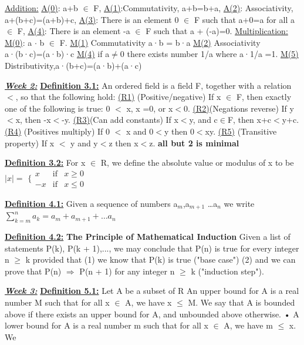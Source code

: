 \documentclass[10pt]{article}
\begin{document}
\underline{Addition:} \underline{A(0)}: a+b $\in$ F, \underline{A(1)}:Commutativity, a+b=b+a, \underline{A(2)}: Associativity, a+(b+c)=(a+b)+c, \underline{A(3)}: There is an element 0 $\in$ F such that a+0=a
for all a $\in$ F, \underline{A(4)}: There is an element -a $\in$ F such that a + (-a)=0.
\underline{Multiplication:} \underline{M(0)}: a $\cdot$ b $\in$ F. \underline{M(1)} Commutativity a·b = b·a \underline{M(2)} Associativity a·(b·c)=(a·b)·c
\underline{M(4)} if a$\neq$0 there exists number 1/a where a·1/a =1. \underline{M(5)} Distributivity,a·(b+c)=(a·b)+(a·c)
\par
\textbf{\textit{\underline{Week 2:}}}
\textbf{\underline{Definition 3.1:}}
An ordered field is a field F, together with a relation $<$, so that the following
hold: \underline{(R1)}  (Positive/negative) If x $\in$ F, then exactly one of the following is true: 0 $<$ x, x =0,
or x$<$0. \underline{(R2)}(Negations reverse) If y $<$x, then -x$<$-y. \underline{(R3)}(Can add constants) If x$<$y, and c$\in$F, then x+c$<$y+c.
\underline{(R4)} (Positives multiply) If 0 $<$ x and 0$<$y then 0$<$xy. \underline{(R5)} (Transitive property) If x $<$ y and y$<$z then x$<$z.
\textbf{all but 2 is minimal}
\par
\textbf{\underline{Definition 3.2:}}
For x $\in$ R, we define the absolute value or modulus of x to be
$|x| =$ $ \{ \begin{array}{rcl}  
        x & \mbox{if} & x \geq  0 \\
        -x & \mbox{if} & x \leq  0 
        \end{array} $ 
\par
\textbf{\underline{Definition 4.1:}}
Given a sequence of numbers a$_m$,a$_{m+1}$  \dots  a$_n$ we write
 $\sum_{k=m}^{n} a_k = a_m +a_{m+1} + \dots a_n$
\par
\textbf{\underline{Definition 4.2:}}
\textbf{The Principle of Mathematical Induction}
Given a list of statements
P(k), P(k + 1),..., we may conclude that P(n) is true for every integer n $\geq$ k provided that
(1) we know that P(k) is true ("base case") (2) and we can prove that P(n) $\Rightarrow$ P(n + 1) for any integer n $\geq$ k ("induction step").
\par
\textbf{\textit{\underline{Week 3:}}}
\textbf{\underline{Definition 5.1:}}
Let A be a subset of R An upper bound for A is a real number M such that for all x $\in$ A, we have x $\leq$ M.
We say that A is bounded above if there exists an upper bound for A, and unbounded
above otherwise.
• A lower bound for A is a real number m such that for all x $\in$ A, we have m $\leq$ x. We
\end{document}
